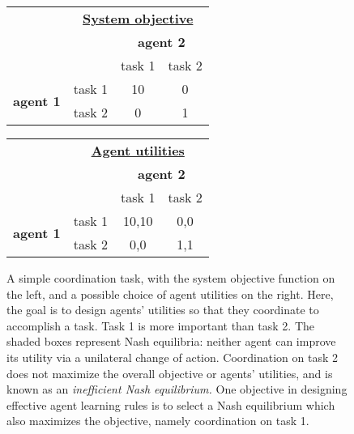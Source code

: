 \begin{example}
\begin{figure}
\begin{center}
\begin{tabular}{rr|c|c|}
\multicolumn{1}{c}{}&\multicolumn{3}{c}{\textbf{\underline{System objective}}}\\
\multicolumn{2}{r}{}&\multicolumn{2}{c}{\textbf{agent 2}}\\
\multicolumn{2}{r}{}
 &  \multicolumn{1}{c}{task 1}
 & \multicolumn{1}{c}{task 2} \\
\cline{3-4}
\multirow{2}{*}{\textbf{agent 1}}
&task 1 & 10 & 0 \\
\cline{3-4}
&task 2 & 0 & 1 \\
\cline{3-4}
\end{tabular}\quad\quad\quad
\begin{tabular}{rr|c|c|}
\multicolumn{1}{c}{}&\multicolumn{3}{c}{\textbf{\underline{Agent utilities}}}\\
\multicolumn{2}{r}{}&\multicolumn{2}{c}{\textbf{agent 2}}\\
\multicolumn{2}{r}{}
 &  \multicolumn{1}{c}{task 1}
 & \multicolumn{1}{c}{task 2} \\
\cline{3-4}
\multirow{2}{*}{\textbf{agent 1}}
&task 1 & \cellcolor[gray]{0.8}10,10 & 0,0 \\
\cline{3-4}
&task 2 & 0,0 & \cellcolor[gray]{0.8}1,1 \\
\cline{3-4}
\end{tabular}
\end{center}
\caption{A simple coordination task, with the system objective function on the left, and a possible choice of agent utilities on the right. Here, the goal is to design agents' utilities so that they coordinate to accomplish a task. Task 1 is more important than task 2. The shaded boxes represent Nash equilibria: neither agent can improve its utility via a unilateral change of action. Coordination on task 2 does not maximize the overall objective or agents' utilities, and is known as an {\it inefficient Nash equilibrium.} One objective in designing effective agent learning rules is to select a Nash equilibrium which also maximizes the objective, namely coordination on task 1.}
\label{t:simple coordination}
\end{figure}

\FloatBarrier
\end{example}





